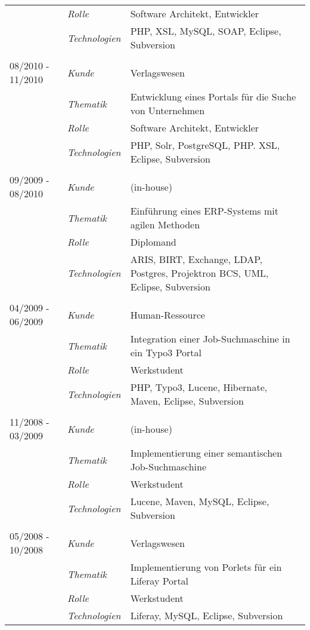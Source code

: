 \begin{longtable}{@{}>{}p{4cm}>{\itshape}p{2cm}>{}p{9cm}}
\nopagebreak		& Rolle 	    & Software Architekt, Entwickler\\
\nopagebreak		& Technologien	& PHP, XSL, MySQL, SOAP, Eclipse, Subversion\\
\\
08/2010 - 11/2010	& Kunde 	    & Verlagswesen\\
\nopagebreak		& Thematik	    & Entwicklung eines Portals für die Suche von Unternehmen\\
\nopagebreak		& Rolle 	    & Software Architekt, Entwickler\\
\nopagebreak		& Technologien	& PHP, Solr, PostgreSQL, PHP. XSL, Eclipse, Subversion\\
\\
09/2009 - 08/2010	& Kunde 	    & (in-house)\\
\nopagebreak		& Thematik	    & Einführung eines ERP-Systems mit agilen Methoden\\
\nopagebreak		& Rolle 	    & Diplomand\\
\nopagebreak		& Technologien	& ARIS, BIRT, Exchange, LDAP, Postgres, Projektron BCS, UML, Eclipse, Subversion\\
\\
04/2009 - 06/2009	& Kunde 	    & Human-Ressource\\
\nopagebreak		& Thematik	    & Integration einer Job-Suchmaschine in ein Typo3 Portal\\
\nopagebreak		& Rolle 	    & Werkstudent\\
\nopagebreak		& Technologien	& PHP, Typo3, Lucene, Hibernate, Maven, Eclipse, Subversion\\
\\
11/2008 - 03/2009	& Kunde 	& (in-house)\\
\nopagebreak		& Thematik	& Implementierung einer semantischen Job-Suchmaschine\\
\nopagebreak		& Rolle 	& Werkstudent\\
\nopagebreak		& Technologien	& Lucene, Maven, MySQL, Eclipse, Subversion\\
\\
05/2008 - 10/2008	& Kunde 	& Verlagswesen\\
\nopagebreak		& Thematik	& Implementierung von Porlets für ein Liferay Portal\\
\nopagebreak		& Rolle 	& Werkstudent\\
\nopagebreak		& Technologien	& Liferay, MySQL, Eclipse, Subversion\\
\end{longtable}
\renewcommand{\arraystretch}{2}


